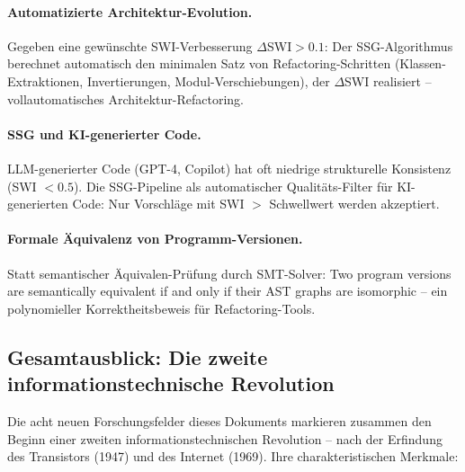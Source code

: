 ﻿\documentclass[a4paper,12pt]{scrreprt}
\theoremstyle{definition}
\begin{document}
\paragraph{Automatizierte Architektur-Evolution.}
Gegeben eine gewünschte SWI-Verbesserung $\Delta$SWI${} > 0.1$:
Der SSG-Algorithmus berechnet automatisch den minimalen Satz von
Refactoring-Schritten (Klassen-Extraktionen, Invertierungen,
Modul-Verschiebungen), der $\Delta$SWI realisiert -- vollautomatisches
Architektur-Refactoring.

\paragraph{SSG und KI-generierter Code.}
LLM-generierter Code (GPT-4, Copilot) hat oft niedrige strukturelle
Konsistenz (SWI $< 0.5$). Die SSG-Pipeline als automatischer
Qualitäts-Filter für KI-generierten Code: Nur Vorschläge mit
SWI $>$ Schwellwert werden akzeptiert.

\paragraph{Formale Äquivalenz von Programm-Versionen.}
Statt semantischer Äquivalen-Prüfung durch SMT-Solver:
Two program versions are semantically equivalent if and only if
their AST graphs are isomorphic -- ein polynomieller Korrektheitsbeweis
für Refactoring-Tools.

\subsection*{Gesamtausblick: Die zweite informationstechnische Revolution}

Die acht neuen Forschungsfelder dieses Dokuments markieren zusammen
den Beginn einer zweiten informationstechnischen Revolution -- nach
der Erfindung des Transistors (1947) und des Internet (1969). Ihre
charakteristischen Merkmale:
\end{document}
